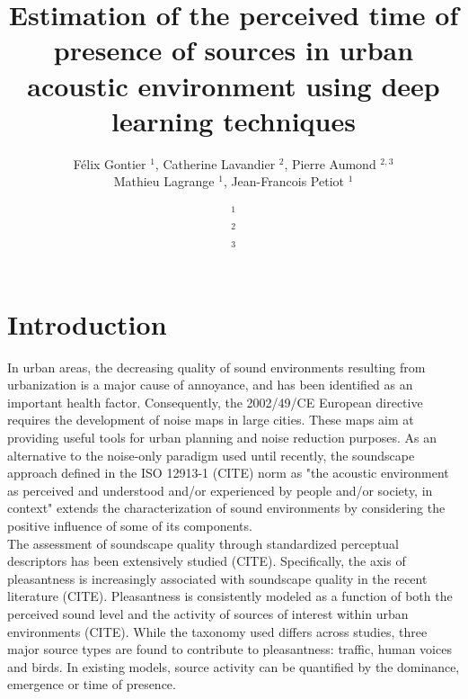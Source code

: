 \documentclass[11pt,a4paper]{article}
\begin{document}
\author{F\'elix Gontier $^1$, Catherine Lavandier $^2$, Pierre Aumond $^{2, 3}$\\Mathieu Lagrange $^1$, Jean-Francois Petiot $^1$}
\date{
$^1$\\
$^2$\\
$^3$
}
\title{Estimation of the perceived time of presence of sources in urban acoustic environment using deep learning techniques}
\maketitle


\begin{abstract}

\end{abstract}

\section{Introduction}
\label{sec:intro}
In urban areas, the decreasing quality of sound environments resulting from urbanization is a major cause of annoyance, and has been identified as an important health factor. Consequently, the 2002/49/CE European directive requires the development of noise maps in large cities. These maps aim at providing useful tools for urban planning and noise reduction purposes. As an alternative to the noise-only paradigm used until recently, the soundscape approach defined in the ISO 12913-1 (CITE) norm as "the acoustic environment as perceived and understood and/or experienced by people and/or society, in context" extends the characterization of sound environments by considering the positive influence of some of its components.\\

The assessment of soundscape quality through standardized perceptual descriptors has been extensively studied (CITE). Specifically, the axis of pleasantness is increasingly associated with soundscape quality in the recent literature (CITE). Pleasantness is consistently modeled as a function of both the perceived sound level and the activity of sources of interest within urban environments (CITE). While the taxonomy used differs across studies, three major source types are found to contribute to pleasantness: traffic, human voices and birds. In existing models, source activity can be quantified by the dominance, emergence or time of presence.\\
\end{document}
